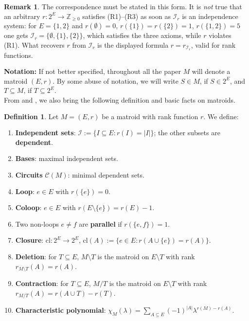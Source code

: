 \documentclass[11pt,a4paper]{article}
\theoremstyle{definition}
\newtheorem{definition}[theorem]{Definition}
\newtheorem{remark}[theorem]{Remark}
\newcommand{\cl}{\mathrm{cl}}
\begin{document}
\begin{remark}
The correspondence must be stated in this form. It is \emph{not} true that an
arbitrary $r:2^E\to\mathbb Z_{\ge0}$ satisfies \textnormal{(R1)}--\textnormal{(R3)}
as soon as $\mathcal I_r$ is an independence system: for $E=\{1,2\}$ and
$r(\emptyset)=0$, $r(\{1\})=r(\{2\})=1$, $r(\{1,2\})=5$ one gets
$\mathcal I_r=\{\emptyset,\{1\},\{2\}\}$, which satisfies the three axioms, while
$r$ violates \textnormal{(R1)}. What recovers $r$ from $\mathcal I_r$ is the
displayed formula $r=r_{\mathcal I_r}$, valid for rank functions.
\end{remark}
\textbf{Notation:} If not better specified, throughout all the paper $M$ will denote a matroid $(E,r)$. By some abuse of notation, we will write $S \in M$, if $S \in 2^E$, and $T \subseteq M$, if $T \subseteq 2^E$. \\

From \cite{welsh} and \cite{whitney35}, we also bring the following definition and basic facts on matroids.

\begin{definition}\label{def:basic}
Let $M = (E, r)$ be a matroid with rank function $r$. We define:
\begin{enumerate}
    \item \textbf{Independent sets}: $\mathcal I:=\{I\subseteq E: r(I)=|I|\}$; the other subsets are \textbf{dependent}.
    \item \textbf{Bases}: maximal independent sets. 
    \item \textbf{Circuits} $\mathcal C(M)$: minimal dependent sets.
    \item \textbf{Loop}: $e\in E$ with $r(\{e\})=0$. 
    \item \textbf{Coloop}: $e\in E$ with $r(E\setminus\{e\})=r(E)-1$. \item Two non-loops $e\ne f$ are \textbf{parallel} if $r(\{e,f\})=1$.
    \item \textbf{Closure}: $\cl:2^E\to2^E$, $\cl(A):=\{e\in E: r(A\cup\{e\})=r(A)\}$.
    \item \textbf{Deletion}: for $T\subseteq E$, $M\setminus T$ is the matroid on $E\setminus T$ with rank $r_{M\setminus T}(A)=r(A)$.
    \item \textbf{Contraction}: for $T\subseteq E$, $M/T$ is the matroid on $E\setminus T$ with rank $r_{M/T}(A)=r(A\cup T)-r(T)$.
    \item \textbf{Characteristic polynomial}: $\chi_M(\lambda)=\sum_{A\subseteq E}(-1)^{|A|}\lambda^{r(M)-r(A)}$.
\end{enumerate}
\end{definition}
\end{document}

